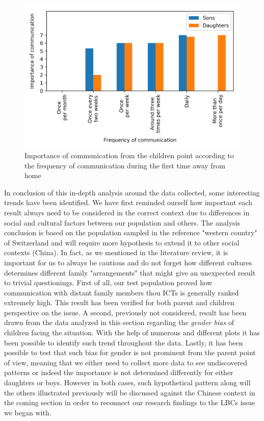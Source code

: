 \begin{figure}[h]
    \centering
    \caption{Importance of communication from the children point according to the frequency of communication during the first time away from home}
    \label{fig:plot_9}
    \includegraphics[scale=0.58]{plots/plot_9.png}
\end{figure}

In conclusion of this in-depth analysis around the data collected, some interesting trends have been identified. We have first reminded ourself how important each result always need to be considered in the correct context due to differences in social and cultural factors between our population and others. The analysis conclusion is based on the population sampled in the reference "western country" of Switzerland and will require more hypothesis to extend it to other social contexts (China). In fact, as we mentioned in the literature review, it is important for us to always be cautious and do not forget how different cultures determines different family "arrangements" that might give an unexpected result to trivial questionings. 
First of all, our test population proved how communication with distant family members thou ICTs is generally ranked extremely high. This result has been verified for both parent and children perspective on the issue. A second, previously not considered, result has been drawn from the data analyzed in this section regarding the \textit{gender bias} of children facing the situation. With the help of numerous and different plots it has been possible to identify such trend throughout the data. Lastly, it has been possible to test that such bias for gender is not prominent from the parent point of view, meaning that we either need to collect more data to see undiscovered patterns or indeed the importance is not determined differently for either daughters or boys. However in both cases, such hypothetical pattern along will the others illustrated previously will be discussed against the Chinese context in the coming section in order to reconnect our research findings to the LBCs issue we began with.
 
